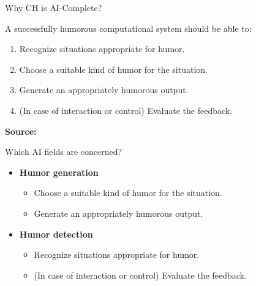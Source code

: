 \begin{frame}[t]{Why CH is AI-Complete?}
\begin{large}
A successfully humorous computational system should be able to:
\begin{enumerate}
  \item Recognize situa­tions appropriate for humor.
  \item Choose a suitable kind of humor for the situation.
  \item Generate an appropriately humorous output.
  \item (In case of interaction or control) Evaluate the feedback.  
\end{enumerate}
\end{large}
\vskip75pt
\small \textbf{Source:}  \cite{stock2003getting}
  \note{}
\end{frame}

\begin{frame}[t]{Which AI fields are concerned?}
\vskip15pt
\begin{Large}
\begin{itemize}
  \item \textbf{Humor generation} 
  \begin{itemize}
    \item Choose a suitable kind of humor for the situation.
    \item Generate an appropriately humorous output. 
  \end{itemize}
\end{itemize}
\vskip20pt
\begin{itemize}
  \item \textbf{Humor detection} 
  \begin{itemize}
    \item Recognize situa­tions appropriate for humor.
    \item (In case of interaction or control) Evaluate the feedback. 
  \end{itemize}  
\end{itemize}

\end{Large}
  \note{}
\end{frame}


